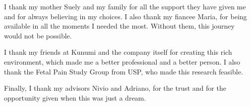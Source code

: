 I thank my mother Suely and my family for all the support they have given me and for always believing in my choices. I also thank my fiancee Maria, for being available in all the moments I needed the most. Without them, this journey would not be possible.

I thank my friends at Kunumi and the company itself for creating this rich environment, which made me a better professional and a better person. I also thank the Fetal Pain Study Group from USP, who made this research feasible. 

Finally, I thank my advisors Nivio and Adriano, for the trust and for the opportunity given when this was just a dream. 